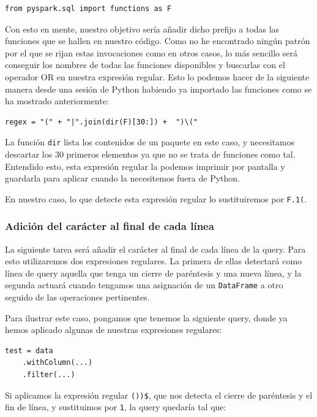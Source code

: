 \documentclass[12pt,twoside,titlepage]{report}
\begin{document}
\begin{lstlisting}
from pyspark.sql import functions as F
\end{lstlisting}

Con esto en mente, nuestro objetivo sería añadir dicho prefijo a todas las funciones que se hallen en nuestro código. Como no he encontrado ningún patrón por el que se rijan estas invocaciones como en otros casos, lo más sencillo será conseguir los nombres de todas las funciones disponibles y buscarlas con el operador OR en nuestra expresión regular. Esto lo podemos hacer de la siguiente manera desde una sesión de Python habiendo ya importado las funciones como se ha mostrado anteriormente:

\begin{lstlisting}
regex = "(" + "|".join(dir(F)[30:]) +  ")\("
\end{lstlisting}

La función \texttt{dir} lista los contenidos de un paquete en este caso, y necesitamos descartar los 30 primeros elementos ya que no se trata de funciones como tal. Entendido esto, esta expresión regular la podemos imprimir por pantalla y guardarla para aplicar cuando la necesitemos fuera de Python.

En nuestro caso, lo que detecte esta expresión regular lo sustituiremos por \texttt{F.1(}.

\subsubsection{Adición del carácter \texttt{} al final de cada línea}

La siguiente tarea será añadir el carácter \texttt{} al final de cada línea de la query. Para esto utilizaremos dos expresiones regulares. La primera de ellas detectará como línea de query aquella que tenga un cierre de paréntesis y una nueva línea, y la segunda actuará cuando tengamos una asignación de un \texttt{DataFrame} a otro seguido de las operaciones pertinentes.

Para ilustrar este caso, pongamos que tenemos la siguiente query, donde ya hemos aplicado algunas de nuestras expresiones regulares:

\begin{lstlisting}
test = data
	.withColumn(...)
	.filter(...)
\end{lstlisting}

Si aplicamos la expresión regular \texttt{())\$}, que nos detecta el cierre de paréntesis y el fin de línea, y sustituimos por \texttt{1}, la query quedaría tal que:
\end{document}
